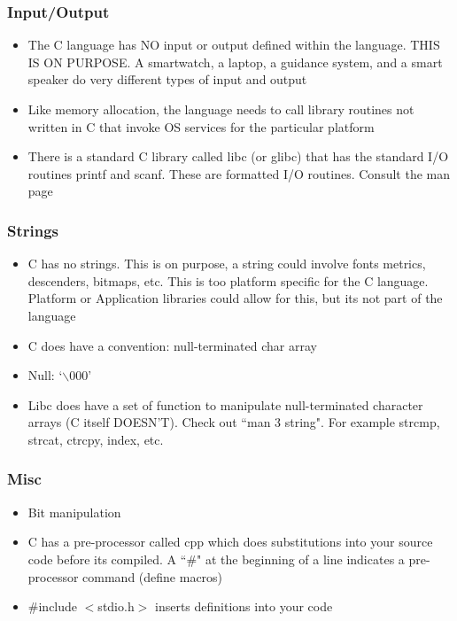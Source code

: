 \subsubsection{Input/Output}
\begin{itemize}
    \item The C language has NO input or output defined within the language. THIS IS ON PURPOSE. A smartwatch, a laptop, a guidance system, and a smart speaker do very different types of input and output
    \item Like memory allocation, the language needs to call library routines not written in C that invoke OS services for the particular platform
    \item There is a standard C library called libc (or glibc) that has the standard I/O routines printf and scanf. These are formatted I/O routines. Consult the man page
\end{itemize}

\subsubsection{Strings}
\begin{itemize}
    \item C has no strings. This is on purpose, a string could involve fonts metrics, descenders, bitmaps, etc. This is too platform specific for the C language. Platform or Application libraries could allow for this, but its not part of the language
    \item C does have a convention: null-terminated char array
    \item Null: `$\backslash$000'
    \item Libc does have a set of function to manipulate null-terminated character arrays (C itself DOESN'T). Check out ``man 3 string". For example strcmp, strcat, ctrcpy, index, etc.
\end{itemize}

\subsubsection{Misc}
\begin{itemize}
    \item Bit manipulation
    \item C has a pre-processor called cpp which does substitutions into your source code before its compiled. A ``\#" at the beginning of a line indicates a pre-processor command (define macros)
    \item \#include $<$stdio.h$>$ inserts definitions into your code
\end{itemize}

